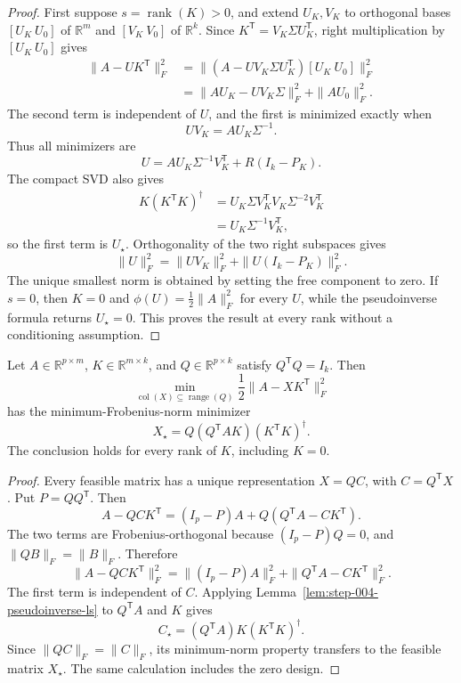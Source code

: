 \begin{proof}
First suppose $s=\operatorname{rank}(K)>0$, and extend $U_K,V_K$ to
orthogonal bases $[U_K\ U_0]$ of $\mathbb R^m$ and $[V_K\ V_0]$ of
$\mathbb R^k$.  Since $K^{\mathsf T}=V_K\Sigma U_K^{\mathsf T}$,
right multiplication by $[U_K\ U_0]$ gives
\[
 \begin{aligned}
 \|A-UK^{\mathsf T}\|_F^2
 &=\|(A-UV_K\Sigma U_K^{\mathsf T})[U_K\ U_0]\|_F^2\\
 &=\|AU_K-UV_K\Sigma\|_F^2+\|AU_0\|_F^2.
 \end{aligned}
\]
The second term is independent of $U$, and the first is minimized exactly
when
\[
 UV_K=AU_K\Sigma^{-1}.
\]
Thus all minimizers are
\[
 U=AU_K\Sigma^{-1}V_K^{\mathsf T}+R(I_k-P_K).
\]
The compact SVD also gives
\[
 \begin{aligned}
 K(K^{\mathsf T}K)^\dagger
 &=U_K\Sigma V_K^{\mathsf T}
 V_K\Sigma^{-2}V_K^{\mathsf T}\\
 &=U_K\Sigma^{-1}V_K^{\mathsf T},
 \end{aligned}
\]
so the first term is $U_\star$.  Orthogonality of the two right subspaces
gives
\[
 \|U\|_F^2=\|UV_K\|_F^2+\|U(I_k-P_K)\|_F^2.
\]
The unique smallest norm is obtained by setting the free component to zero.
If $s=0$, then $K=0$ and
$\phi(U)=\frac12\|A\|_F^2$ for every $U$, while the pseudoinverse formula
returns $U_\star=0$.  This proves the result at every rank without a
conditioning assumption.
\end{proof}

\begin{lemma}\label{lem:step-004-constrained-block}
Let $A\in\mathbb R^{p\times m}$, $K\in\mathbb R^{m\times k}$, and
$Q\in\mathbb R^{p\times k}$ satisfy $Q^{\mathsf T}Q=I_k$.  Then
\[
 \min_{\operatorname{col}(X)\subseteq\operatorname{range}(Q)}
 \frac12\|A-XK^{\mathsf T}\|_F^2
\]
has the minimum-Frobenius-norm minimizer
\[
 X_\star=Q(Q^{\mathsf T}AK)(K^{\mathsf T}K)^\dagger.
\]
The conclusion holds for every rank of $K$, including $K=0$.
\end{lemma}

\begin{proof}
Every feasible matrix has a unique representation $X=QC$, with
$C=Q^{\mathsf T}X$.  Put $P=QQ^{\mathsf T}$.  Then
\[
 A-QCK^{\mathsf T}
 =(I_p-P)A+Q(Q^{\mathsf T}A-CK^{\mathsf T}).
\]
The two terms are Frobenius-orthogonal because $(I_p-P)Q=0$, and
$\|QB\|_F=\|B\|_F$.  Therefore
\[
 \|A-QCK^{\mathsf T}\|_F^2
 =\|(I_p-P)A\|_F^2
 +\|Q^{\mathsf T}A-CK^{\mathsf T}\|_F^2.
\]
The first term is independent of $C$.  Applying
Lemma~\ref{lem:step-004-pseudoinverse-ls} to $Q^{\mathsf T}A$ and $K$
gives
\[
 C_\star=(Q^{\mathsf T}A)K(K^{\mathsf T}K)^\dagger.
\]
Since $\|QC\|_F=\|C\|_F$, its minimum-norm property transfers to the
feasible matrix $X_\star$.  The same calculation includes the zero design.
\end{proof}

